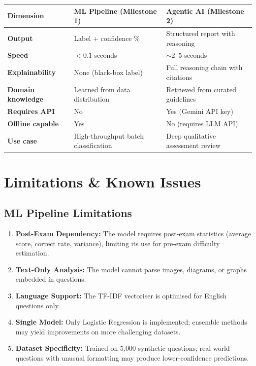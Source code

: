 \documentclass[12pt, a4paper, twoside]{article}
\begin{document}
\begin{center}
\renewcommand{\arraystretch}{1.3}
\begin{tabularx}{\textwidth}{l X X}
    \toprule
    \textbf{Dimension} & \textbf{ML Pipeline (Milestone 1)} &
    \textbf{Agentic AI (Milestone 2)} \\
    \midrule
    \textbf{Output} & Label + confidence \% & Structured report
    with reasoning \\
    \textbf{Speed} & $< 0.1$ seconds & $\sim 2$--5 seconds \\
    \textbf{Explainability} & None (black-box label) &
    Full reasoning chain with citations \\
    \textbf{Domain knowledge} & Learned from data distribution &
    Retrieved from curated guidelines \\
    \textbf{Requires API} & No & Yes (Gemini API key) \\
    \textbf{Offline capable} & Yes & No (requires LLM API) \\
    \textbf{Use case} & High-throughput batch classification &
    Deep qualitative assessment review \\
    \bottomrule
\end{tabularx}
\end{center}

\section{Limitations \& Known Issues}\label{sec:limitations}

\subsection{ML Pipeline Limitations}

\begin{enumerate}[leftmargin=2em]
    \item \textbf{Post-Exam Dependency:} The model requires post-exam
          statistics (average score, correct rate, variance), limiting
          its use for pre-exam difficulty estimation.

    \item \textbf{Text-Only Analysis:} The model cannot parse images,
          diagrams, or graphs embedded in questions.

    \item \textbf{Language Support:} The TF-IDF vectoriser is
          optimised for English questions only.

    \item \textbf{Single Model:} Only Logistic Regression is
          implemented; ensemble methods may yield improvements on
          more challenging datasets.

    \item \textbf{Dataset Specificity:} Trained on 5{,}000 synthetic
          questions; real-world questions with unusual formatting may
          produce lower-confidence predictions.
\end{enumerate}
\end{document}
